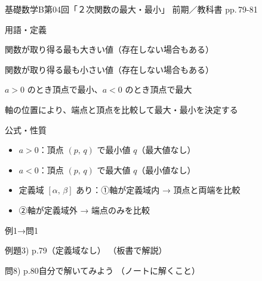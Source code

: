 \documentclass[aspectratio=43,professionalfonts,handout]{beamer}
\newcommand{\LectureNum}{04}
\newcommand{\LectureTitle}{２次関数の最大・最小}
\newcommand{\TextPages}{pp.\,79-81}
\newcommand{\CourseName}{基礎数学B}
\renewcommand{\TermName}{前期}
\begin{document}
\begin{frame}{\CourseName\quad 第\LectureNum 回「\LectureTitle 」}
  {\small \TermName\quad \TeacherName\quad ／\quad 教科書 \TextPages}

  \begin{block}{用語・定義}
  \begin{description}[labelwidth=5.5em]
    \item[\kw{最大値}] 関数が取り得る最も大きい値（存在しない場合もある）
    \item[\kw{最小値}] 関数が取り得る最も小さい値（存在しない場合もある）
    \item[\kw{定義域なし}] $a>0$ のとき頂点で最小、$a<0$ のとき頂点で最大
    \item[\kw{定義域あり}] 軸の位置により、端点と頂点を比較して最大・最小を決定する
  \end{description}
  \end{block}
\end{frame}

\begin{frame}{公式・性質}
  \begin{block}{}
  \begin{itemize}
    \item $a>0$：頂点 $(p,\,q)$ で最小値 $q$（最大値なし）
    \item $a<0$：頂点 $(p,\,q)$ で最大値 $q$（最小値なし）
    \item 定義域 $[\alpha,\,\beta]$ あり：①軸が定義域内 → 頂点と両端を比較
    \item \phantom{定義域 $[\alpha,\,\beta]$ あり：}②軸が定義域外 → 端点のみを比較
  \end{itemize}
  \end{block}
\end{frame}

\begin{frame}{例1→問1}
  \begin{exampleblock}{例題3) p.79（定義域なし）}
    （板書で解説）
  \end{exampleblock}

  \vfill

  \begin{block}{問8) p.80\quad 自分で解いてみよう}
    （ノートに解くこと）
  \end{block}
\end{frame}
\end{document}
